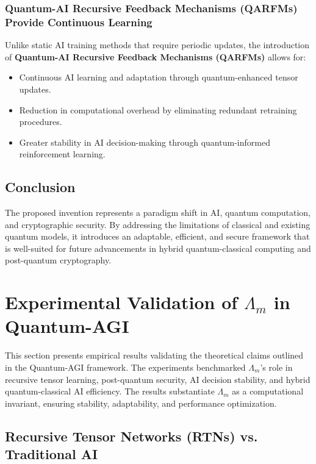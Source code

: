 \documentclass{article}
\theoremstyle{plain}
\begin{document}
\subsubsection{Quantum-AI Recursive Feedback Mechanisms (QARFMs) Provide Continuous Learning}

Unlike static AI training methods that require periodic updates, the introduction of \textbf{Quantum-AI Recursive Feedback Mechanisms (QARFMs)} allows for:
\begin{itemize}
    \item Continuous AI learning and adaptation through quantum-enhanced tensor updates.
    \item Reduction in computational overhead by eliminating redundant retraining procedures.
    \item Greater stability in AI decision-making through quantum-informed reinforcement learning.
\end{itemize}

\subsection{Conclusion}

The proposed invention represents a paradigm shift in AI, quantum computation, and cryptographic security. By addressing the limitations of classical and existing quantum models, it introduces an adaptable, efficient, and secure framework that is well-suited for future advancements in hybrid quantum-classical computing and post-quantum cryptography.

\section{Experimental Validation of $\Lambda_m$ in Quantum-AGI}

This section presents empirical results validating the theoretical claims outlined in the Quantum-AGI framework. The experiments benchmarked $\Lambda_m$’s role in recursive tensor learning, post-quantum security, AI decision stability, and hybrid quantum-classical AI efficiency. The results substantiate $\Lambda_m$ as a computational invariant, ensuring stability, adaptability, and performance optimization.

\subsection{Recursive Tensor Networks (RTNs) vs. Traditional AI}
\end{document}
